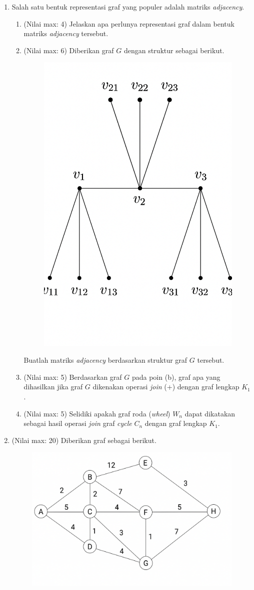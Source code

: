 \documentclass{article}
\begin{document}
\begin{enumerate}
    \item Salah satu bentuk representasi graf yang populer adalah matriks \textit{adjacency}.
    
    \begin{enumerate}
        \item (Nilai max: 4) Jelaskan apa perlunya representasi graf dalam bentuk matriks \textit{adjacency} tersebut.
        
        \item (Nilai max: 6) Diberikan graf $G$ dengan struktur sebagai berikut.
        
        \begin{figure}[H]
            \centering
            \includegraphics[width=0.4\linewidth]{graf 1.png}
        \end{figure}
        
        Buatlah matriks \textit{adjacency} berdasarkan struktur graf $G$ tersebut.
        
        \item (Nilai max: 5) Berdasarkan graf $G$ pada poin (b), graf apa yang dihasilkan jika graf $G$ dikenakan operasi \textit{join} (+) dengan graf lengkap $K_1$.
        
        \item (Nilai max: 5) Selidiki apakah graf roda (\textit{wheel}) $W_n$ dapat dikatakan sebagai hasil operasi \textit{join} graf \textit{cycle} $C_n$ dengan graf lengkap $K_1$.
    \end{enumerate}

    \item (Nilai max: 20) Diberikan graf sebagai berikut.

    \begin{figure}[H]
        \centering
        \includegraphics[width=0.6\linewidth]{graf 2.png}
    \end{figure}
    

\end{enumerate}
\end{document}
